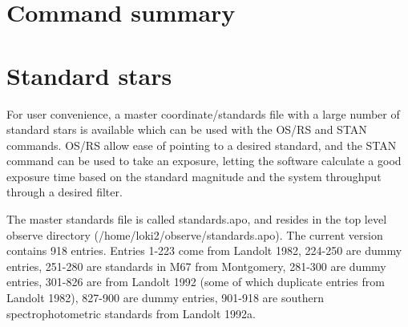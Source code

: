 \documentclass[10pt]{report}
\begin{document}
\chapter{Command summary}



\chapter{Standard stars }

For user convenience, a master coordinate/standards file with a large number 
of standard stars is available which can be used with the OS/RS and STAN
commands. OS/RS allow ease of pointing to a desired standard, and the STAN
command can be used to take an exposure, letting the software calculate a
good exposure time based on the standard magnitude and the system
throughput through a desired filter.

The master standards file is called standards.apo, and resides in the top
level observe directory (/home/loki2/observe/standards.apo). The current
version contains 918 entries. Entries 1-223 come from Landolt 1982,
224-250 are dummy entries, 251-280 are standards in M67 from Montgomery,
281-300 are dummy entries, 301-826 are from Landolt 1992 (some of which
duplicate entries from Landolt 1982), 827-900 are
dummy entries, 901-918 are southern spectrophotometric standards
from Landolt 1992a.
\end{document}
